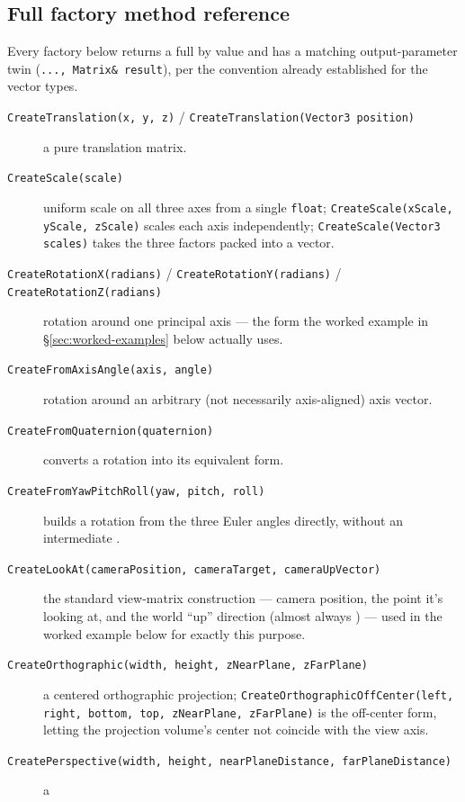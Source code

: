 \subsection{Full factory method reference}
\label{sec:matrix-full-reference}

Every factory below returns a full  by value and has a matching
output-parameter twin (\texttt{..., Matrix\& result}), per the convention already established
for the vector types.

\begin{description}
\item[\texttt{CreateTranslation(x, y, z)} / \texttt{CreateTranslation(Vector3 position)}] a
  pure translation matrix.
\item[\texttt{CreateScale(scale)}] uniform scale on all three axes from a single \texttt{float};
  \texttt{CreateScale(xScale, yScale, zScale)} scales each axis independently;
  \texttt{CreateScale(Vector3 scales)} takes the three factors packed into a vector.
\item[\texttt{CreateRotationX(radians)} / \texttt{CreateRotationY(radians)} /
  \texttt{CreateRotationZ(radians)}] rotation around one principal axis --- the form the worked
  example in \S\ref{sec:worked-examples} below actually uses.
\item[\texttt{CreateFromAxisAngle(axis, angle)}] rotation around an arbitrary (not necessarily
  axis-aligned) axis vector.
\item[\texttt{CreateFromQuaternion(quaternion)}] converts a  rotation into
  its equivalent  form.
\item[\texttt{CreateFromYawPitchRoll(yaw, pitch, roll)}] builds a rotation from the three Euler
  angles directly, without an intermediate .
\item[\texttt{CreateLookAt(cameraPosition, cameraTarget, cameraUpVector)}] the standard
  view-matrix construction --- camera position, the point it's looking at, and the world ``up''
  direction (almost always ) --- used in the worked example below for
  exactly this purpose.
\item[\texttt{CreateOrthographic(width, height, zNearPlane, zFarPlane)}] a centered orthographic
  projection; \texttt{CreateOrthographicOffCenter(left, right, bottom, top, zNearPlane,
  zFarPlane)} is the off-center form, letting the projection volume's center not coincide with
  the view axis.
\item[\texttt{CreatePerspective(width, height, nearPlaneDistance, farPlaneDistance)}] a

\end{description}
